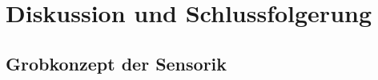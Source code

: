 \chapter{Diskussion und Schlussfolgerung}
\label{chap:entwicklung}


\section{Grobkonzept der Sensorik}
\label{sec:grobkonzept}